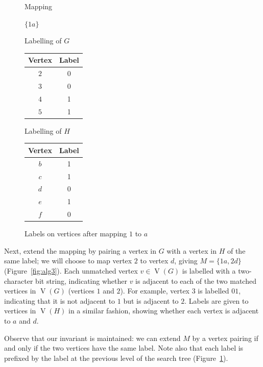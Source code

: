 \documentclass[letterpaper]{article}
\DeclareMathOperator{\V}{V}
\begin{document}
\begin{figure}[ht]
\centering
\begin{minipage}[t]{0.15\linewidth}
    Mapping

    \bigskip

    $\{1a\}$
\end{minipage}
\quad
\begin{minipage}[t]{0.3\linewidth}
    Labelling of $G$
    \begin{tabular}[t]{cc}
    \hline
        Vertex & Label\\
    \hline
        $2$ & 0 \\
        $3$ & 0 \\
        $4$ & 1 \\
        $5$ & 1 \\
    \hline
    \end{tabular}
\end{minipage}
\quad
\begin{minipage}[t]{0.3\linewidth}
    Labelling of $H$
    \begin{tabular}[t]{cc}
    \hline
        Vertex & Label\\
    \hline
        $b$ & 1 \\
        $c$ & 1 \\
        $d$ & 0 \\
        $e$ & 1 \\
        $f$ & 0 \\
    \hline
    \end{tabular}
\end{minipage}
    \caption{Labels on vertices after mapping $1$ to $a$}
\label{fig:alg2}
\end{figure}

Next, extend the mapping by pairing a vertex in $G$ with a vertex in $H$ of the
same label; we will choose to map vertex $2$ to vertex $d$, giving $M=\{1a,
2d\}$ (Figure~\ref{fig:alg3}).  Each unmatched vertex $v \in \V(G)$ is labelled
with a two-character bit string, indicating whether $v$ is adjacent to each of
the two matched vertices in $\V(G)$ (vertices $1$ and $2$).  For example, vertex
$3$ is labelled $01$, indicating that it is not adjacent to $1$ but is adjacent
to $2$.  Labels are given to vertices in $\V(H)$ in a similar fashion, showing
whether each vertex is adjacent to $a$ and $d$.

Observe that our invariant is maintained: we can extend $M$ by a vertex pairing if
and only if the two vertices have the same label. Note also that each label is prefixed
by the label at the previous level of the search tree (Figure~\ref{fig:alg2}).
\end{document}
